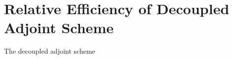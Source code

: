 \chapter{Relative Efficiency of Decoupled Adjoint Scheme}
\label{chapter-nine}

The decoupled adjoint scheme 

